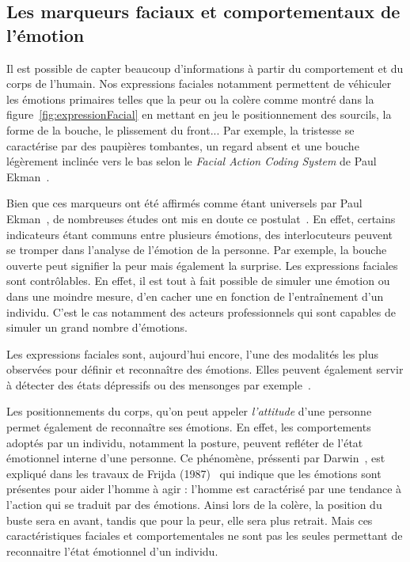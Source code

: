 \subsection{Les marqueurs faciaux et comportementaux de l'émotion}


Il est possible de capter beaucoup d'informations à partir du comportement et du corps de l'humain. %
Nos expressions faciales notamment permettent de véhiculer les émotions primaires telles que la peur ou la colère comme montré dans la figure~\ref{fig:expressionFacial} en mettant en jeu le positionnement des sourcils, la forme de la bouche, le plissement du front...
Par exemple, la tristesse se caractérise par des paupières tombantes, un regard absent et une bouche légèrement inclinée vers le bas selon le \textit{Facial Action Coding System} de Paul Ekman~\cite{Ekman1978}.

Bien que ces marqueurs ont été affirmés comme étant universels par Paul Ekman~\cite{Ekman1978}, de nombreuses études ont mis en doute ce postulat~\cite{Leys2010,Gendron2014}. En effet, certains indicateurs étant communs entre plusieurs émotions, des interlocuteurs peuvent se tromper dans l'analyse de l'émotion de la personne. Par exemple, la bouche ouverte peut signifier la peur mais également la surprise. Les expressions faciales sont contrôlables. En effet, il est tout à fait possible de simuler une émotion ou dans une moindre mesure, d'en cacher une en fonction de l’entraînement d'un individu. C'est le cas notamment des acteurs professionnels qui sont capables de simuler un grand nombre d'émotions.

Les expressions faciales sont, aujourd'hui encore, l'une des modalités les plus observées pour définir et reconnaître des émotions. Elles peuvent également servir à détecter des états dépressifs ou des mensonges par exemple~\cite{Suslow2001,Owayjan2012}.

Les positionnements du corps, qu'on peut appeler \textit{l'attitude} d'une personne permet également de reconnaître ses émotions. En effet, les comportements adoptés par un individu, notamment la posture, peuvent refléter de l'état émotionnel interne d'une personne. Ce phénomène, préssenti par Darwin~\cite{Darwin1872}, est expliqué dans les travaux de Frijda (1987)~\cite{Frijda1987} qui indique que les émotions sont présentes pour aider l'homme à agir : l'homme est caractérisé par une tendance à l'action qui se traduit par des émotions. Ainsi lors de la colère, la position du buste sera en avant, tandis que pour la peur, elle sera plus retrait. Mais ces caractéristiques faciales et comportementales ne sont pas les seules permettant de reconnaitre l'état émotionnel d'un individu.

